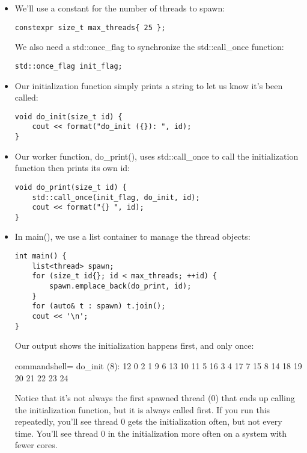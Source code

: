 \begin{itemize}
\item 
We'll use a constant for the number of threads to spawn:

\begin{lstlisting}[style=styleCXX]
constexpr size_t max_threads{ 25 };
\end{lstlisting}

We also need a std::once\_flag to synchronize the std::call\_once function:

\begin{lstlisting}[style=styleCXX]
std::once_flag init_flag;
\end{lstlisting}

\item 
Our initialization function simply prints a string to let us know it's been called:

\begin{lstlisting}[style=styleCXX]
void do_init(size_t id) {
	cout << format("do_init ({}): ", id);
}
\end{lstlisting}

\item 
Our worker function, do\_print(), uses std::call\_once to call the initialization function then prints its own id:

\begin{lstlisting}[style=styleCXX]
void do_print(size_t id) {
	std::call_once(init_flag, do_init, id);
	cout << format("{} ", id);
}
\end{lstlisting}

\item 
In main(), we use a list container to manage the thread objects:

\begin{lstlisting}[style=styleCXX]
int main() {
	list<thread> spawn;
	for (size_t id{}; id < max_threads; ++id) {
		spawn.emplace_back(do_print, id);
	}
	for (auto& t : spawn) t.join();
	cout << '\n';
}
\end{lstlisting}

Our output shows the initialization happens first, and only once:

\begin{tcblisting}{commandshell={}}
do_init (8): 12 0 2 1 9 6 13 10 11 5 16 3 4 17 7 15 8 14
18 19 20 21 22 23 24
\end{tcblisting}

Notice that it's not always the first spawned thread (0) that ends up calling the initialization function, but it is always called first. If you run this repeatedly, you'll see thread 0 gets the initialization often, but not every time. You'll see thread 0 in the initialization more often on a system with fewer cores.
\end{itemize}

